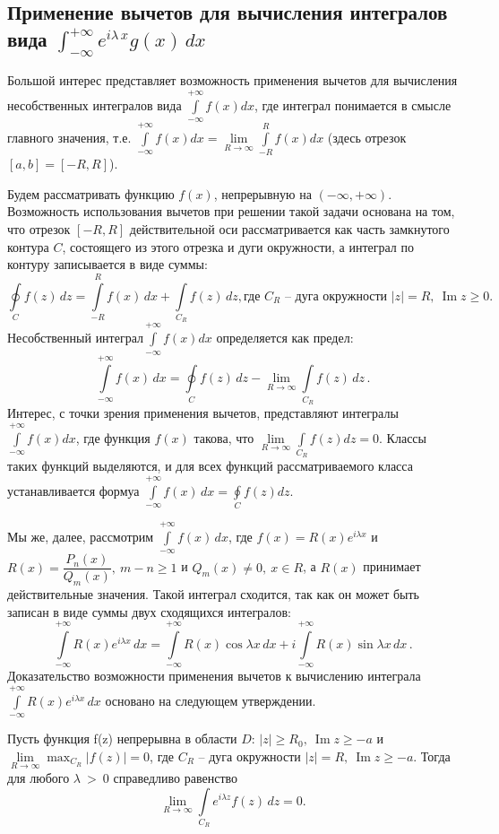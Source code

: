 \subsection{Применение вычетов для вычисления интегралов вида $\int_{-\infty}^{+\infty}e^{i\lambda\,x}g(x)\,dx$}
Большой интерес представляет возможность применения вычетов для вычисления несобственных интегралов вида $\textstyle{\int\limits_{-\infty}^{+\infty} f(x)dx}$, где интеграл понимается в смысле главного значения, т.е. $\textstyle{\int\limits_{-\infty}^{+\infty} f(x)dx= \lim\limits_{R\to\infty} \int\limits_{-R}^{R}f(x)dx}$ (здесь отрезок $[a,b]=[-R,R]$). 

Будем рассматривать функцию $f(x)$, непрерывную на $(-\infty,+\infty)$. Возможность использования вычетов при решении такой задачи основана на том, что отрезок $[-R,R]$ действительной оси рассматривается как часть замкнутого контура $C$, состоящего из этого отрезка и дуги окружности, а интеграл по контуру записывается в виде суммы:
$$
\oint\limits_{C} f(z)\,dz= \int\limits_{-R}^{R}f(x)\,dx+ \int\limits_{C_R}f(z)\,dz, \text{где $C_R$ -- дуга окружности } |z|=R,~ \operatorname{Im}z\geqslant0.
$$
Несобственный интеграл$ \textstyle{\int\limits_{-\infty}^{+\infty} f(x)dx}$ определяется как предел:
$$
\int\limits_{-\infty}^{+\infty} f(x)\,dx= \oint\limits_{C}f(z)\,dz-\lim\limits_{R\to\infty} \int\limits_{C_R}f(z)\,dz\,.
$$
Интерес, с точки зрения применения вычетов, представляют интегралы $\textstyle{\int\limits_{-\infty}^{+\infty} f(x)dx}$, где функция $f(x)$ такова, что $\textstyle{\lim\limits_{R\to\infty} \int\limits_{C_R} f(z)dz=0}$. Классы таких функций выделяются, и для всех функций рассматриваемого класса устанавливается формуа $\textstyle{\int\limits_{-\infty}^{+\infty} f(x)\,dx= \oint\limits_{C} f(z)dz}$.

Мы же, далее, рассмотрим $\textstyle{\int\limits_{-\infty}^{+\infty} f(x)\,dx}$, где $f(x)=R(x)e^{i\lambda x}$ и $R(x)= \dfrac{P_n(x)}{Q_m(x)},~m-n \geqslant 1$ и $Q_m(x)\ne0,~ x\in R$, а $R(x)$ принимает действительные значения. Такой интеграл сходится, так как он может быть записан в виде суммы двух сходящихся интегралов:
$$
\int\limits_{-\infty}^{+\infty} R(x)e^{i\lambda x}\,dx= \int\limits_{-\infty}^{+\infty} R(x)\cos\lambda x\,dx+ i\int\limits_{-\infty}^{+\infty} R(x)\sin\lambda x\,dx\,.
$$
Доказательство возможности применения вычетов к вычислению интеграла $\textstyle{\int\limits_{-\infty}^{+\infty} R(x)e^{i\lambda x}\,dx}$ основано на следующем утверждении.
\begin{assertion}
Пусть функция f(z) непрерывна в области $D:\, |z| \geqslant R_0,~ \operatorname{Im}z \geqslant-a$ и $\lim\limits_{R\to\infty} \max_{C_R}|f(z)|=0$, где $C_R$ -- дуга окружности $|z|=R,~ \operatorname{Im}z\geqslant-a$. Тогда для любого $\lambda\:>\:0$ справедливо равенство
$$
\lim\limits_{R\to\infty} \int\limits_{C_R} e^{i\lambda z}f(z)\,dz=0.
$$
\end{assertion}

